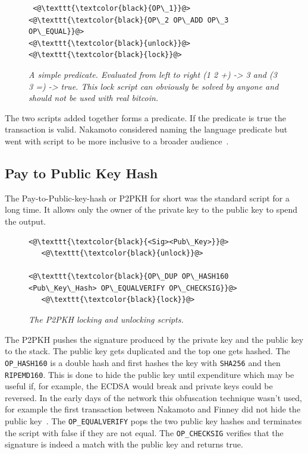 \begin{figure}[!hbt]
		\centering
	\begin{lstlisting}
 <@\texttt{\textcolor{black}{OP\_1}}@>   <@\texttt{\textcolor{black}{OP\_2 OP\_ADD OP\_3 OP\_EQUAL}}@>
<@\texttt{\textcolor{black}{unlock}}@>           <@\texttt{\textcolor{black}{lock}}@>
	\end{lstlisting}
	
	\caption{\textit{ A simple predicate. Evaluated from left to right (1 2 +) -> 3 and
			(3 3 =) -> true. This lock script can obviously be solved by anyone and should not be used with real bitcoin.
	}}
	\label{fig:simple:script}
\end{figure}

The two scripts added together forms a predicate. If the predicate is true the transaction is valid. Nakamoto considered naming the language predicate but went with script to be more inclusive to a broader audience~\cite{nakamoto:predicate}.

\subsection{Pay to Public Key Hash}

The Pay-to-Public-key-\gls{hash} or P2PKH for short was the standard script for a long time. It allows only the owner of 
the private key to the public key to spend the output.

\begin{figure}[!hbt]
		\centering
	\begin{lstlisting}
<@\texttt{\textcolor{black}{<Sig><Pub\_Key>}}@>   
   <@\texttt{\textcolor{black}{unlock}}@>
   
<@\texttt{\textcolor{black}{OP\_DUP OP\_HASH160 <Pub\_Key\_Hash> OP\_EQUALVERIFY OP\_CHECKSIG}}@>
   <@\texttt{\textcolor{black}{lock}}@>
	\end{lstlisting}
	
	\caption{\textit{ The P2PKH locking and unlocking scripts.
	}}
	\label{fig:P2PKH}
\end{figure}

The P2PKH pushes the signature produced by the private key and the public key to the stack. The public key gets duplicated and the top one gets hashed. The \texttt{OP\_HASH160} is a double \gls{hash} and first hashes the key with \texttt{SHA256} and then \texttt{RIPEMD160}. This is done to hide the public key until expenditure which may be useful if, for example, the ECDSA would break and private keys could be reversed. In the early days of the network this obfuscation technique wasn't used, for example the first transaction between Nakamoto and Finney did not hide the public key~\cite{nakamoto:finney:tx}. The \texttt{OP\_EQUALVERIFY} pops the two public key hashes and terminates the script with false if they are not equal. The \texttt{OP\_CHECKSIG} verifies that the signature is indeed a match with the public key and returns true. 


